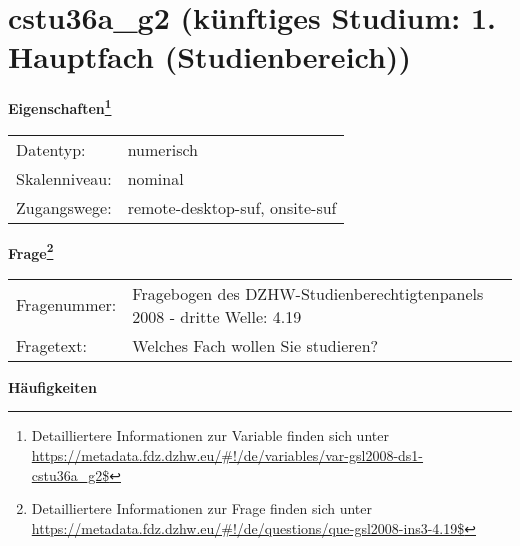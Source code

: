
    \setcounter{footnote}{0}

    \vspace*{-1.8cm}
	\section{cstu36a\_g2 (künftiges Studium: 1. Hauptfach (Studienbereich))}
	\label{section:cstu36a_g2}



    \vspace*{0.5cm}
    \noindent\textbf{Eigenschaften\footnote{Detailliertere Informationen zur Variable finden sich unter
		\url{https://metadata.fdz.dzhw.eu/\#!/de/variables/var-gsl2008-ds1-cstu36a_g2$}}}\\
	\begin{tabularx}{\hsize}{@{}lX}
	Datentyp: & numerisch \\
	Skalenniveau: & nominal \\
	Zugangswege: &
	  remote-desktop-suf, 
	  onsite-suf
 \\
    \end{tabularx}



				\vspace*{0.5cm}
                \noindent\textbf{Frage\footnote{Detailliertere Informationen zur Frage finden sich unter
		              \url{https://metadata.fdz.dzhw.eu/\#!/de/questions/que-gsl2008-ins3-4.19$}}}\\
				\begin{tabularx}{\hsize}{@{}lX}
					Fragenummer: &
					  Fragebogen des DZHW-Studienberechtigtenpanels 2008 - dritte Welle:
					  4.19
 \\
					Fragetext: & Welches Fach wollen Sie studieren? \\
				\end{tabularx}





        		\vspace*{0.5cm}
                \noindent\textbf{Häufigkeiten}

